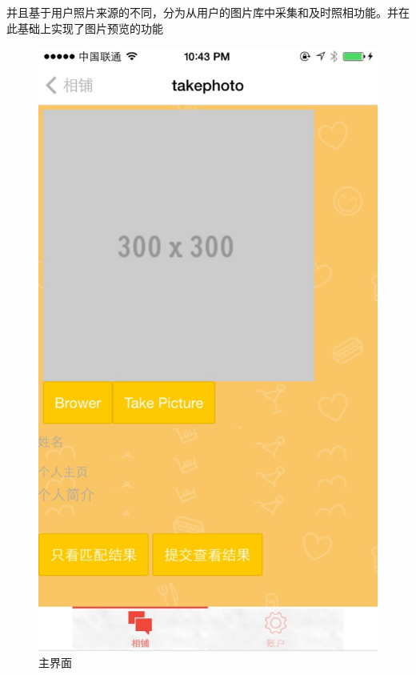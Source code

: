 并且基于用户照片来源的不同，分为从用户的图片库中采集和及时照相功能。并在此基础上实现了图片预览的功能
\begin{figure}[h] 
\begin{minipage}[t]{0.45\linewidth}
\centering
\includegraphics[width=\textwidth]{img/chap4/take1.jpg}
\caption{主界面\label{flickr}}
\end{minipage}
\hfill
\begin{minipage}[t]{0.45\linewidth}
\centering

\end{minipage}
\end{figure}
